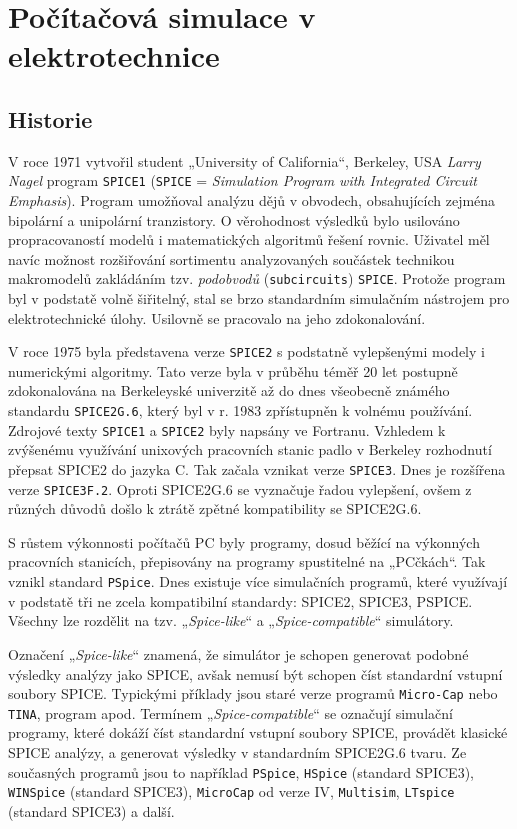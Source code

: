 \chapter{Počítačová simulace v elektrotechnice}
\minitoc
\newpage
  \section{Historie}
    V roce 1971 vytvořil student „University of California“, Berkeley, USA \emph{Larry Nagel} program \texttt{SPICE1} (\texttt{SPICE} =
    \emph{Simulation Program with Integrated Circuit Emphasis}). Program umožňoval analýzu dějů v obvodech, obsahujících zejména bipolární a
    unipolární tranzistory. O věrohodnost výsledků bylo usilováno propracovaností modelů i matematických algoritmů řešení rovnic. Uživatel měl navíc
    možnost roz\-ši\-řo\-vá\-ní sortimentu analyzovaných součástek technikou makromodelů zakládáním tzv. \emph{pod\-ob\-vo\-dů}
    (\texttt{subcircuits}) \texttt{SPICE}. Protože program byl v podstatě volně šiřitelný, stal se brzo standardním simulačním nástrojem pro
    elektrotechnické úlohy. Usilovně se pracovalo na jeho zdokonalování.

    V roce 1975 byla představena verze \texttt{SPICE2} s podstatně vylepšenými modely i numerickými algoritmy. Tato verze byla v průběhu téměř 20 let
    postupně zdokonalována na Berkeleyské univerzitě až do dnes všeobecně známého standardu \texttt{SPICE2G.6}, který byl v r. 1983 zpřístupněn k
    volnému používání. Zdrojové texty \texttt{SPICE1} a \texttt{SPICE2} byly napsány ve Fortranu. Vzhledem k zvýšenému využívání unixových pracovních
    stanic padlo v Berkeley rozhodnutí přepsat SPICE2 do jazyka C. Tak začala vznikat verze \texttt{SPICE3}. Dnes je rozšířena verze
    \texttt{SPICE3F.2}. Oproti SPICE2G.6 se vyznačuje řadou vylepšení, ovšem z různých důvodů došlo k ztrátě zpětné kompatibility se SPICE2G.6.

    S růstem výkonnosti počítačů PC byly programy, dosud běžící na výkonných pracovních stanicích, přepisovány na programy spustitelné na „PCčkách“.
    Tak vznikl standard \texttt{PSpice}. Dnes existuje více simulačních programů, které využívají v podstatě tři ne zcela kompatibilní standardy:
    SPICE2, SPICE3, PSPICE. Všechny lze rozdělit na tzv. „\emph{Spice-like}“ a „\emph{Spice-compatible}“ simulátory.

    Označení „\emph{Spice-like}“ znamená, že simulátor je schopen generovat podobné výsledky analýzy jako SPICE, avšak nemusí být schopen číst
    standardní vstupní soubory SPICE. Typickými příklady jsou staré verze programů \texttt{Micro-Cap} nebo \texttt{TINA}, program apod. Termínem
    „\emph{Spice-compatible}“ se označují simulační programy, které dokáží číst standardní vstupní soubory SPICE, provádět klasické SPICE analýzy, a
    generovat výsledky v standardním SPICE2G.6 tvaru. Ze současných programů jsou to například \texttt{PSpice}, \texttt{HSpice} (standard SPICE3),
    \texttt{WINSpice} (standard SPICE3), \texttt{MicroCap} od verze IV, \texttt{Multisim}, \texttt{LTspice} (standard SPICE3) a další.

